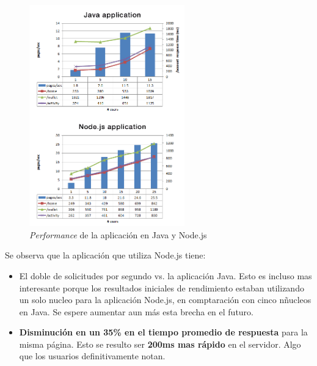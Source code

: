 \begin{figure}[h!]
	\centering
	\includegraphics[width=0.6\textwidth]{figuras/cap2/java_nodejs_benchmark_paypal.png}
	\caption{\textit{Performance} de la aplicación en Java y Node.js}
	\label{cap2:figure:java_benchmark_paypal}
\end{figure}

Se observa que la aplicación que utiliza Node.js tiene:



\begin{itemize}
\item El doble de solicitudes por segundo vs. la aplicación Java. Esto es incluso mas interesante porque los resultados iniciales de rendimiento estaban utilizando un solo nucleo para la aplicación Node.js, en comptaración con cinco nñucleos en Java. Se espere aumentar aun más esta brecha en el futuro.
\item \textbf{Disminución en un 35\% en el tiempo promedio de respuesta} para la misma página. Esto se resulto ser \textbf{200ms mas rápido} en el servidor. Algo que los usuarios definitivamente notan.
\end{itemize}


